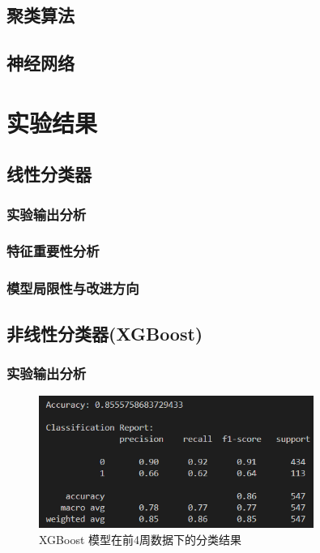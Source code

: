 \documentclass{SYSUReport}
\begin{document}
\subsection{聚类算法}

\subsection{神经网络}

\section{实验结果}

\subsection{线性分类器}
\subsubsection{实验输出分析}
\subsubsection{特征重要性分析}
\subsubsection{模型局限性与改进方向}

\subsection{非线性分类器(XGBoost)}
\subsubsection{实验输出分析}

\begin{figure}[htbp]
    \centering
    \includegraphics[width=0.8\textwidth]{figures/XGBoost_result.png}
    \caption{XGBoost 模型在前4周数据下的分类结果}
    \label{fig:xgboost_result}
\end{figure}
\end{document}
